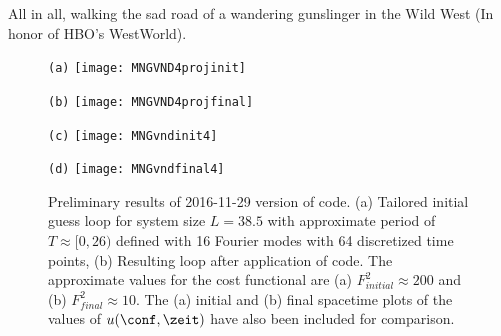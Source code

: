 \begin{description}
{All in all, walking the sad road of a wandering gunslinger in the Wild West (In honor of HBO's WestWorld).
}

\begin{figure}%
\begin{minipage}[height=.32\textheight]{.5\textwidth}
\centering \small{\texttt{(a)}}
\texttt{[image: MNGVND4projinit]}
\end{minipage}
\begin{minipage}[height=.32\textheight]{.5\textwidth}
\centering \small{\texttt{(b)}}
\texttt{[image: MNGVND4projfinal]}
\end{minipage}
\begin{minipage}[height=.32\textheight]{.5\textwidth}
\centering \small{\texttt{(c)}}
\texttt{[image: MNGvndinit4]}
\end{minipage}
\begin{minipage}[height=.32\textheight]{.5\textwidth}
\centering \small{\texttt{(d)}}
\texttt{[image: MNGvndfinal4]}
\end{minipage}
\caption{ \label{fig:MNGVND4}
Preliminary results of 2016-11-29 version of {\descent} code.
(a) Tailored initial guess loop for system size $L=38.5$ with approximate
period of $T \approx [0,26)$ defined with 16 Fourier modes with 64 discretized
time points,
(b) Resulting loop after application of {\descent} code. The approximate values
for the cost functional are (a) $F_{initial}^2 \approx 200$ and (b)
$F_{final}^2 \approx 10$. The (a) initial and (b) final spacetime plots of the
values of $u(\conf,\zeit)$ have also been included for comparison.
}
\end{figure}



\end{description}
